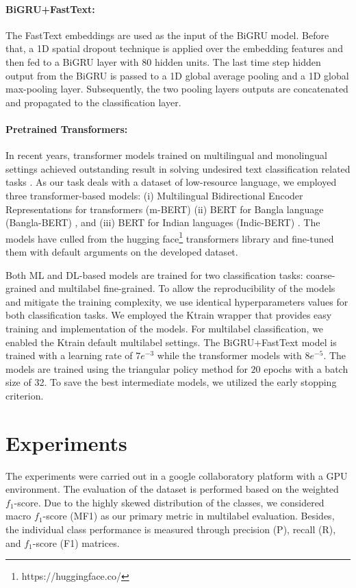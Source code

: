 \documentclass[11pt]{article}
\begin{document}
\paragraph{BiGRU+FastText:} The FastText \cite{joulin2016fasttext} embeddings are used as the input of the BiGRU model. Before that, a 1D spatial dropout technique is applied over the embedding features and then fed to a BiGRU layer with 80 hidden units. The last time step hidden output from the BiGRU is passed to a 1D global average pooling and a 1D global max-pooling layer. Subsequently, the two pooling layers outputs are concatenated and propagated to the classification layer.    
\paragraph{Pretrained Transformers:} In recent years, transformer \cite{vaswani2017attention} models trained on multilingual and monolingual settings achieved outstanding result in solving undesired text classification related tasks \cite{SHARIF2021,hossain-etal-2021-nlp}. As our task deals with a dataset of low-resource language, we employed three transformer-based models: (i) Multilingual Bidirectional Encoder Representations for transformers (m-BERT) \cite{mbert} (ii) BERT for Bangla language (Bangla-BERT) \cite{banglabert}, and (iii) BERT for Indian languages (Indic-BERT) \cite{indicbert}. The models have culled from the hugging face\footnote{https://huggingface.co/} transformers library and fine-tuned them with default arguments on the developed dataset.  

Both ML and DL-based models are trained for two classification tasks: coarse-grained and multilabel fine-grained. To allow the reproducibility of the models and mitigate the training complexity, we use identical hyperparameters values for both classification tasks. We employed the Ktrain \cite{maiya2020ktrain} wrapper that provides easy training and implementation of the models. For multilabel classification, we enabled the Ktrain default multilabel settings. The BiGRU+FastText model is trained with a learning rate of $7e^{-3}$ while the transformer models with $8e^{-5}$. The models are trained using the triangular policy method \cite{smith2017cyclical} for $20$ epochs with a batch size of 32. To save the best intermediate models, we utilized the early stopping criterion. 

\section{Experiments}
The experiments were carried out in a google collaboratory platform with a GPU environment. The evaluation of the dataset is performed based on the weighted $f_1$-score. Due to the highly skewed distribution of the classes, we considered macro $f_1$-score (MF1) as our primary metric in multilabel evaluation. Besides, the individual class performance is measured through precision (P), recall (R), and $f_1$-score (F1) matrices.  
\end{document}
